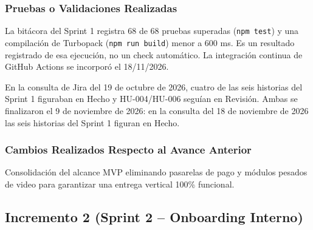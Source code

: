 \documentclass[11pt,a4paper]{article}
\begin{document}
\subsubsection{Pruebas o Validaciones Realizadas}
La bitácora del Sprint 1 registra 68 de 68 pruebas superadas (\texttt{npm test}) y una compilación de Turbopack (\texttt{npm run build}) menor a 600 ms. Es un resultado registrado de esa ejecución, no un check automático. La integración continua de GitHub Actions se incorporó el 18/11/2026.

En la consulta de Jira del 19 de octubre de 2026, cuatro de las seis historias del Sprint 1 figuraban en Hecho y HU-004/HU-006 seguían en Revisión. Ambas se finalizaron el 9 de noviembre de 2026: en la consulta del 18 de noviembre de 2026 las seis historias del Sprint 1 figuran en Hecho.

\subsubsection{Cambios Realizados Respecto al Avance Anterior}
Consolidación del alcance MVP eliminando pasarelas de pago y módulos pesados de video para garantizar una entrega vertical 100\% funcional.

\subsection{Incremento 2 (Sprint 2 -- Onboarding Interno)}
\end{document}
